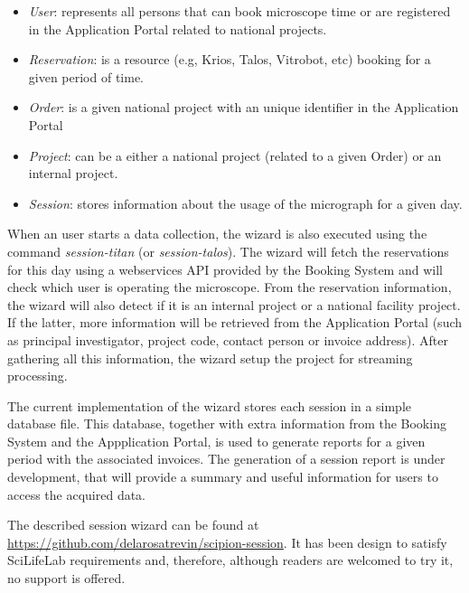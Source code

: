 \begin{itemize}
\setlength\itemsep{0em}
 \item \textit{User}: represents all persons that can book microscope time or are registered in the Application Portal 
 related to national projects.
 \item \textit{Reservation}:  is a resource (e.g, Krios, Talos, Vitrobot, etc) booking for a given period of time.
 \item \textit{Order}:  is a given national project with an unique identifier in the Application Portal
 \item \textit{Project}:  can be a either a national project (related to a given Order) or an internal project.
 \item \textit{Session}:  stores information about the usage of the micrograph for a given day.
\end{itemize}

When an user starts a data collection, the wizard is also executed using the command \textit{session-titan} (or \textit{session-talos}). The wizard will fetch the reservations for this day using a webservices API provided by the Booking System and will check which user is operating the microscope. From the reservation information, the wizard will also detect if it is an internal project or a national facility project. If the latter, more information will be retrieved from the Application Portal (such as principal investigator, project code, contact person or invoice address). After gathering all this information, the wizard setup the \scipion project for streaming processing. %

The current implementation of the wizard stores each session in a simple database file. This database, together with extra information from the Booking System and the Appplication Portal, is used to generate reports for a given period with the associated invoices. The generation of a session report is under development, that 
will provide a summary and useful information for users to access the acquired data. 

The described session wizard can be found at  \url{https://github.com/delarosatrevin/scipion-session}. It has been design to satisfy SciLifeLab requirements and, therefore, although readers are welcomed to try it, no support is offered.



